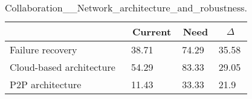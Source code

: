 
  \begin{table*}[]
  \centering
  \notsotiny
  \caption{ Collaboration__Network_architecture_and_robustness.}
\label{tab:collaboration__network_architecture_and_robustness}
\begin{tabular}{|l|l|l|l|}
  \hline
  \rowcolor[HTML]{C0C0C0}
    \multicolumn{1}{|c|}{Feature} & \multicolumn{1}{c|}{Current} & \multicolumn{1}{c|}{Need} & \multicolumn{1}{c|}{$\Delta$} \\ \hline
  Failure recovery & 38.71 & 74.29 & 35.58 \\ \hline 
Cloud-based architecture & 54.29 & 83.33 & 29.05 \\ \hline 
P2P architecture & 11.43 & 33.33 & 21.9 \\ \hline 
\end{tabular}%
  \end{table*}